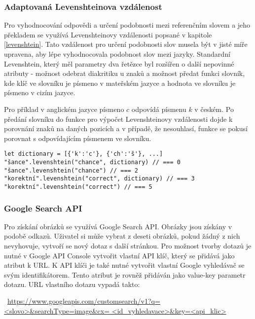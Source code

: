 \documentclass[a4paper,11pt,titlepage,fleqn]{article}
\begin{document}
        \subsubsection{Adaptovaná Levenshteinova vzdálenost}
            Pro vyhodnocování odpovědi a určení podobnosti mezi referenčním slovem a jeho překladem se využívá Levenshteinovy vzdálenosti popsané v kapitole \ref{levenshtein}. Tato vzdálenost pro určení podobnosti slov musela být v jisté míře upravena, aby lépe vyhodnocovala podobnost slov mezi jazyky. Standardní Levenshtein, který měl parametry dva řetězce byl rozšířen o další nepovinné atributy - možnost odebrat diakritiku u znaků a možnost předat funkci slovník, kde klíč ve slovníku je písmeno v mateřském jazyce a hodnota ve slovníku je písmeno v cizím jazyce. 

            Pro příklad v anglickém jazyce písmeno $c$ odpovídá písmenu $k$ v českém. Po předání slovníku do funkce pro výpočet Levenshteinovy vzdálenosti dojde k porovnání znaků na daných pozicích a v případě, že nesouhlasí, funkce se pokusí porovnat s odpovídajícím písmenem ve slovníku.

\begin{lstlisting}[language=JS, caption={Příklady použití Levenshteinovy vzdálenosti},label=code:levenshtein]
let dictionary = [{'k':'c'}, {'ch':'š'}, ...]
"šance".levenshtein("chance", dictionary) // === 0
"šance".levenshtein("chance") // === 2
"korektní".levenshtein("correct", dictionary) // === 3
"korektní".levenshtein("correct") // === 5
\end{lstlisting}

        \subsubsection{Google Search API}
            Pro získání obrázků se využívá Google Search API. Obrázky jsou získány v podobě odkazů. Uživatel si může vybrat z deseti obrázků, pokud žádný z nich nevyhovuje, vytvoří se nový dotaz s další stránkou. Pro možnost tvorby dotazů je nutné v Google API Console vytvořit vlastní API klíč, který se přidává jako atribut k URL. K API klíči je také nutné vytvořit vlastní Google vyhledávač se svým identifikátorem. Tento atribut je rovněž přidáván jako value-key parametr dotazu. URL vlastního dotazu vypadá takto:

            ~\url{https://www.googleapis.com/customsearch/v1?q=<slovo>&searchType=image&cx=
            <id_vyhledavace>&key=<api_klic>}
\end{document}
